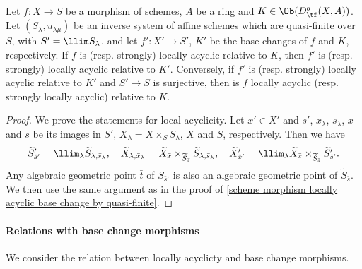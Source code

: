\begin{corollary}\label{scheme morphism locally acyclic base change by limit}
Let $f:X\to S$ be a morphism of schemes, $A$ be a ring and $K\in\Ob(D^b_{\tf}(X,A))$. Let $(S_\lambda,u_{\lambda\mu})$ be an inverse system of affine schemes which are quasi-finite over $S$, with $S'=\llim S_\lambda$. and let $f':X'\to S'$, $K'$ be the base changes of $f$ and $K$, respectively. If $f$ is (resp. strongly) locally acyclic relative to $K$, then $f'$ is (resp. strongly) locally acyclic relative to $K'$. Conversely, if $f'$ is (resp. strongly) locally acyclic relative to $K'$ and $S'\to S$ is surjective, then is $f$ locally acyclic (resp. strongly locally acyclic) relative to $K$.
\end{corollary}
\begin{proof}
We prove the statements for local acyclicity. Let $x'\in X'$ and $s'$, $x_\lambda$, $s_\lambda$, $x$ and $s$ be its images in $S'$, $X_\lambda=X\times_SS_\lambda$, $X$ and $S$, respectively. Then we have
\[\widetilde{S}'_{\bar{s}'}=\llim_\lambda\widetilde{S}_{\lambda,\bar{s}_\lambda},\quad \widetilde{X}_{\lambda,\bar{x}_\lambda}=\widetilde{X}_{\bar{x}}\times_{\widetilde{S}_{\bar{s}}}\widetilde{S}_{\lambda,\bar{s}_\lambda},\quad \widetilde{X}'_{\bar{x}'}=\llim_\lambda\widetilde{X}_{\bar{x}}\times_{\widetilde{S}_{\bar{s}}}\widetilde{S}'_{\bar{s}'}.\]
Any algebraic geometric point $\bar{t}$ of $\widetilde{S}_{\bar{s}'}$ is also an algebraic geometric point of $\widetilde{S}_{\bar{s}}$. We then use the same argument as in the proof of \cref{scheme morphism locally acyclic base change by quasi-finite}.
\end{proof}

\paragraph{Relations with base change morphisms}
We consider the relation between locally acyclicty and base change morphisms. 

